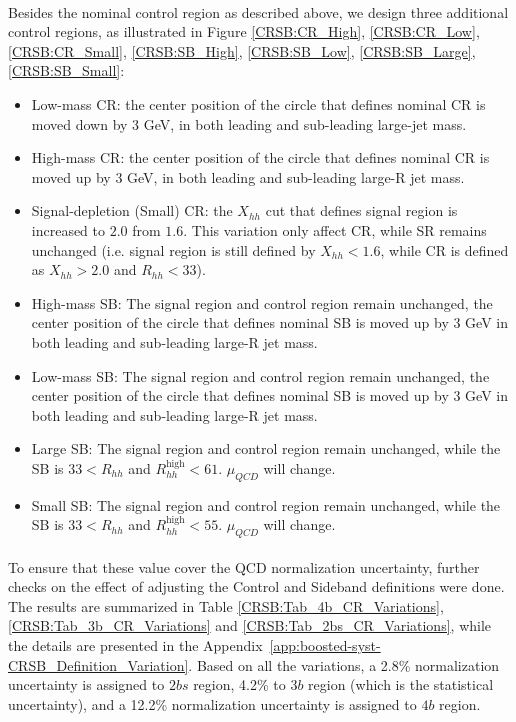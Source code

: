 \paragraph{}
Besides the nominal control region as described above, we design three additional control regions, as illustrated in Figure \ref{CRSB:CR_High}, \ref{CRSB:CR_Low}, \ref{CRSB:CR_Small}, \ref{CRSB:SB_High}, \ref{CRSB:SB_Low}, \ref{CRSB:SB_Large}, \ref{CRSB:SB_Small}:
\begin{itemize}
	\item Low-mass CR: the center position of the circle that defines nominal CR is moved down by 3 GeV, in both leading and sub-leading large-jet mass.
	\item High-mass CR: the center position of the circle that defines nominal CR is moved up by 3 GeV, in both leading and sub-leading large-R jet mass.
	\item Signal-depletion (Small) CR: the $X_{hh}$ cut that defines signal region is increased to $2.0$ from $1.6$. This variation only affect CR, while SR remains unchanged (i.e. signal region is still defined by $X_{hh}<1.6$, while CR is defined as $X_{hh}>2.0$ and $R_{hh}<33$).
	\item High-mass SB: The signal region and control region remain unchanged, the center position of the circle that defines nominal SB is moved up by 3 GeV in both leading and sub-leading large-R jet mass.
	\item Low-mass SB: The signal region and control region remain unchanged, the center position of the circle that defines nominal SB is moved up by 3 GeV in both leading and sub-leading large-R jet mass.
	\item Large SB: The signal region and control region remain unchanged, while the SB is $33 < R_{hh}$ and $ R_{hh}^{\text{high}} < 61$. $\mu_{QCD}$ will change.
	\item Small SB: The signal region and control region remain unchanged, while the SB is $33 < R_{hh}$ and $ R_{hh}^{\text{high}} < 55$. $\mu_{QCD}$ will change.
\end{itemize}

\paragraph{}
To ensure that these value cover the QCD normalization uncertainty, further checks on the effect of adjusting the Control and Sideband definitions were done. 
The results are summarized in Table \ref{CRSB:Tab_4b_CR_Variations}, \ref{CRSB:Tab_3b_CR_Variations} and \ref{CRSB:Tab_2bs_CR_Variations}, while the details are presented in the Appendix~\ref{app:boosted-syst-CRSB_Definition_Variation}. Based on all the variations, a 2.8\% normalization uncertainty is assigned to $2bs$ region, 4.2\% to $3b$ region (which is the statistical uncertainty), and a 12.2\% normalization uncertainty is assigned to $4b$ region.

